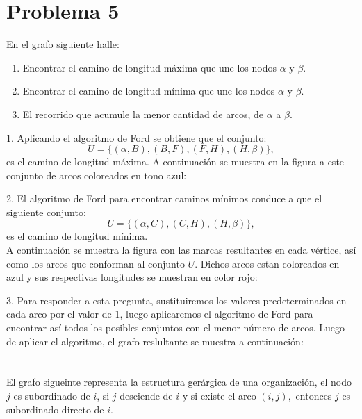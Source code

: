 \documentclass[autocontact]{gaceta}
\begin{document}
\section{Problema 5}
En el grafo siguiente halle:
    \begin{enumerate}
        \item Encontrar el camino de longitud máxima que une los nodos $\alpha$ y $\beta$.
        \item Encontrar el camino de longitud mínima que une los nodos $\alpha$ y $\beta$.
        \item El recorrido que acumule la menor cantidad de arcos, de $\alpha$ a $\beta$.
    \end{enumerate}

    
    

    1. Aplicando el algoritmo de Ford se obtiene que el conjunto:
    $$ U = \{ (\alpha, B), (B, F), (F, H), (H, \beta) \}, $$
    es el camino de longitud máxima. A continuación se muestra en la figura a este conjunto de arcos 
    coloreados en tono azul:

    


    2. El algoritmo de Ford para encontrar caminos mínimos conduce a que el siguiente conjunto:
    $$ U = \{ (\alpha, C), (C, H), (H, \beta) \}, $$
    es el camino de longitud mínima.\\ A continuación se muestra la figura con las marcas resultantes 
    en cada vértice, así como los arcos que conforman 
    al conjunto $U$. Dichos arcos estan coloreados en azul y sus respectivas longitudes se muestran en color
    rojo:

    

    3. Para responder a esta pregunta, sustituiremos los valores predeterminados en cada 
    arco por el valor de 1, luego aplicaremos el algoritmo de Ford para encontrar así 
    todos los posibles conjuntos con el menor número de arcos.
    Luego de aplicar el algoritmo, el grafo reslultante se muestra a continuación:


    


\section{}
    El grafo sigueinte representa la estructura gerárgica de una organización, el nodo 
    $j$ es subordinado de $i$, si $j$ desciende de $i$ y si existe el arco $(i,j),$ entonces
    $j$ es subordinado directo de $i$.
    
\end{document}
